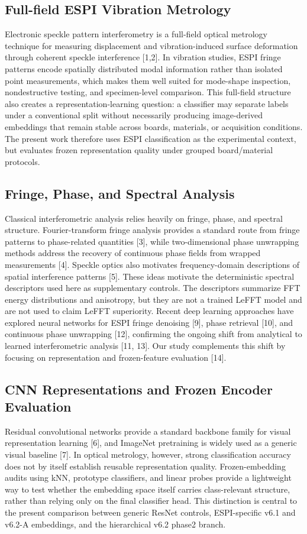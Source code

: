 \documentclass[review,3p,times]{elsarticle}
\begin{document}
\subsection{Full-field ESPI Vibration Metrology}
Electronic speckle pattern interferometry is a full-field optical metrology technique for measuring displacement and vibration-induced surface deformation through coherent speckle interference [1,2]. In vibration studies, ESPI fringe patterns encode spatially distributed modal information rather than isolated point measurements, which makes them well suited for mode-shape inspection, nondestructive testing, and specimen-level comparison. This full-field structure also creates a representation-learning question: a classifier may separate labels under a conventional split without necessarily producing image-derived embeddings that remain stable across boards, materials, or acquisition conditions. The present work therefore uses ESPI classification as the experimental context, but evaluates frozen representation quality under grouped board/material protocols.

\subsection{Fringe, Phase, and Spectral Analysis}
Classical interferometric analysis relies heavily on fringe, phase, and spectral structure. Fourier-transform fringe analysis provides a standard route from fringe patterns to phase-related quantities [3], while two-dimensional phase unwrapping methods address the recovery of continuous phase fields from wrapped measurements [4]. Speckle optics also motivates frequency-domain descriptions of spatial interference patterns [5]. These ideas motivate the deterministic spectral descriptors used here as supplementary controls. The descriptors summarize FFT energy distributions and anisotropy, but they are not a trained LeFFT model and are not used to claim LeFFT superiority. Recent deep learning approaches have explored neural networks for ESPI fringe denoising [9], phase retrieval [10], and continuous phase unwrapping [12], confirming the ongoing shift from analytical to learned interferometric analysis [11, 13]. Our study complements this shift by focusing on representation and frozen-feature evaluation [14].

\subsection{CNN Representations and Frozen Encoder Evaluation}
Residual convolutional networks provide a standard backbone family for visual representation learning [6], and ImageNet pretraining is widely used as a generic visual baseline [7]. In optical metrology, however, strong classification accuracy does not by itself establish reusable representation quality. Frozen-embedding audits using kNN, prototype classifiers, and linear probes provide a lightweight way to test whether the embedding space itself carries class-relevant structure, rather than relying only on the final classifier head. This distinction is central to the present comparison between generic ResNet controls, ESPI-specific v6.1 and v6.2-A embeddings, and the hierarchical v6.2 phase2 branch.
\end{document}

